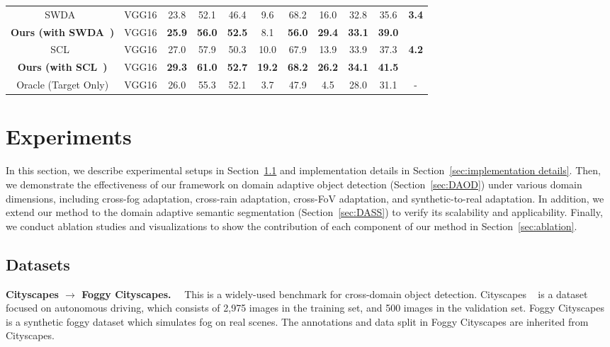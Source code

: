 \documentclass[10pt,journal,compsoc]{IEEEtran}
\renewcommand{\paragraph}[1]{\noindent\textbf{#1}~~}
\begin{document}
\begin{table*}
{{\begin{tabular}{c|c|ccccccc|c|c}
\midrule
SWDA~\cite{SWDA} & VGG16 & 23.8 & 52.1 & 46.4 & 9.6 & 68.2 & 16.0 & 32.8 & 35.6 & \multirow{2}{*}{\textbf{3.4}}\\
\textbf{Ours (with SWDA~\cite{SWDA})} & VGG16 & \textbf{25.9} & \textbf{56.0} & \textbf{52.5} & 8.1 & \textbf{56.0} & \textbf{29.4} & \textbf{33.1} & \textbf{39.0} &\\
\midrule
SCL~\cite{SCL} & VGG16 & 27.0 & 57.9 & 50.3 & 10.0 & 67.9 & 13.9 & 33.9 & 37.3 & \multirow{2}{*}{\textbf{4.2}}\\
\textbf{Ours (with SCL~\cite{SCL})} & VGG16 & \textbf{29.3} & \textbf{61.0} & \textbf{52.7} & \textbf{19.2} & \textbf{68.2} & \textbf{26.2} & \textbf{34.1} & \textbf{41.5} &\\
\midrule
Oracle (Target Only) & VGG16 &26.0  &55.3  &52.1  &3.7  &47.9  &4.5  &28.0  &31.1  &-\\
\bottomrule
\end{tabular}
}
}
\label{table:ob_comb}
\end{table*}

\section{Experiments}
In this section, we describe experimental setups in Section~\ref{sec:datasets} and implementation details in Section~\ref{sec:implementation details}. Then, we demonstrate the effectiveness of our framework on domain adaptive object detection (Section~\ref{sec:DAOD}) under various domain dimensions, including cross-fog adaptation, cross-rain adaptation, cross-FoV adaptation, and synthetic-to-real adaptation.  In addition, we extend our method to the domain adaptive semantic segmentation (Section~\ref{sec:DASS}) to verify its scalability and applicability. Finally, we conduct ablation studies and visualizations to 
show the contribution of each component of our method in Section~\ref{sec:ablation}.
 
\subsection{Datasets}
\label{sec:datasets}
\paragraph{Cityscapes $\rightarrow$ Foggy Cityscapes.} This is a widely-used benchmark for cross-domain object detection. Cityscapes ~\cite{cordts2016cityscapes} is a dataset focused on autonomous driving, which consists of 2,975 images in the training set, and 500 images in the validation set. 
Foggy  Cityscapes~\cite{FoggyCity} is a synthetic foggy dataset which simulates fog on real scenes. 
The annotations and data split in Foggy Cityscapes are inherited from Cityscapes.
\end{document}
